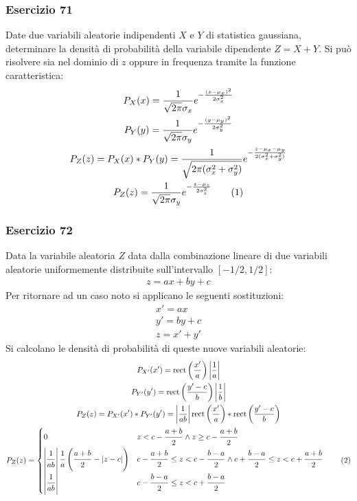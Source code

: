 \documentclass{article}
\newcommand{\rect}{\mathrm{rect}}
\newcommand{\tageq}{\tag{\stepcounter{equation}\theequation}}
\begin{document}
\subsubsection*{Esercizio 71}

Date due variabili aleatorie indipendenti $X$ e $Y$ di statistica gaussiana, determinare la densità di probabilità della variabile dipendente $Z=X+Y$. 
Si può risolvere sia nel dominio di $z$ oppure in frequenza tramite la funzione caratteristica:
\begin{gather*}
    P_X(x)=\displaystyle\frac{1}{\sqrt{2\pi}\sigma_x}e^{-\frac{(x-\mu_x)^2}{2\sigma_x^2}}\\
    P_Y(y)=\displaystyle\frac{1}{\sqrt{2\pi}\sigma_y}e^{-\frac{(y-\mu_y)^2}{2\sigma_y^2}}\\
    P_Z(z)=P_X(x)*P_Y(y)=\displaystyle\frac{1}{\sqrt{2\pi(\sigma_x^2+\sigma_y^2)}}e^{-\frac{z-\mu_x-\mu_y}{2(\sigma_x^2+\sigma_y^2)}}\\
    P_Z(z)=\displaystyle\frac{1}{\sqrt{2\pi}\sigma_y}e^{-\frac{z-\mu_z}{2\sigma_z^2}}\tageq
\end{gather*} 

\subsubsection*{Esercizio 72}

Data la variabile aleatoria $Z$ data dalla combinazione lineare di due variabili aleatorie uniformemente distribuite sull'intervallo $[-1/2,1/2]$:
\begin{gather*}
    z=ax+by+c
\end{gather*}
Per ritornare ad un caso noto si applicano le seguenti sostituzioni:
\begin{gather*}
    x'=ax\\
    y'=by+c\\
    z=x'+y'
\end{gather*}
Si calcolano le densità di probabilità di queste nuove variabili aleatorie:
\begin{gather*}
    P_{X'}(x')=\rect\displaystyle\left(\frac{x'}{a}\right)\left|\frac{1}{a}\right|\\
    P_{Y'}(y')=\rect\displaystyle\left(\frac{y'-c}{b}\right)\left|\frac{1}{b}\right|\\
    P_Z(z)=P_{X'}(x')*P_{Y'}(y')=\displaystyle\left|\frac{1}{ab}\right|\rect\left(\frac{x'}{a}\right)*\rect\left(\frac{y'-c}{b}\right)\\
    P_Z(z)=\begin{cases}
        0 &z<c-\displaystyle\frac{\strut a+b}{\strut 2} \land z\geq c-\frac{\strut a+b}{\strut 2}\\
        \displaystyle \left|\frac{\strut 1}{\strut ab}\right|\frac{\strut 1}{\strut a}\left(\frac{\strut a+b}{\strut 2}-|z-c|\right)&\displaystyle c-\frac{\strut a+b}{2}\leq z< c-\frac{\strut b-a}{\strut 2}\land c+\frac{\strut b-a}{\strut 2}\leq z<c+\frac{\strut a+b}{\strut 2}\\
        \displaystyle\left|\frac{\strut 1}{\strut ab}\right|&c-\displaystyle\frac{\strut b-a}{\strut 2}\leq z<c+\frac{\strut b-a}{\strut 2}
    \end{cases}\tageq
\end{gather*}
\end{document}
